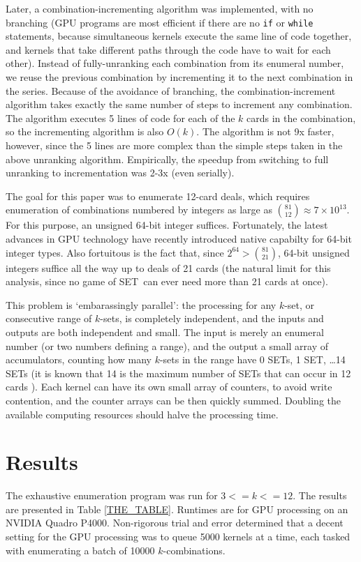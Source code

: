 \documentclass[10pt]{amsart}
\newcommand{\SETb}{SET\texttrademark\ } %
\begin{document}
Later, a combination-incrementing algorithm was implemented, with no branching
(GPU programs are most efficient if there are no {\tt if} or {\tt while}
statements, because simultaneous kernels execute the same line of code together,
and kernels that take different paths through the code have to wait for each
other). Instead of fully-unranking each combination from its enumeral number, we
reuse the previous combination by incrementing it to the next combination in the
series. Because of the avoidance of branching, the combination-increment
algorithm takes exactly the same number of steps to increment any
combination. The algorithm executes 5 lines of code for each of the $k$ cards in
the combination, so the incrementing algorithm is also $O(k)$. The algorithm is
not 9x faster, however, since the 5 lines are more complex than the simple steps
taken in the above unranking algorithm. Empirically, the speedup from switching
to full unranking to incrementation was 2-3x (even serially).

The goal for this paper was to enumerate 12-card deals, which requires
enumeration of combinations numbered by integers as large as $\binom{81}{12}
\approx 7\times 10^{13}$. For this purpose, an unsigned 64-bit integer
suffices. Fortunately, the latest advances in GPU technology have recently
introduced native capabilty for 64-bit integer types. Also fortuitous is the
fact that, since $2^{64} > \binom{81}{21}$, 64-bit unsigned integers suffice all
the way up to deals of 21 cards (the natural limit for this analysis, since no
game of \SETb can ever need more than 21 cards at once).

This problem is `embarassingly parallel': the processing for any $k$-set, or
consecutive range of $k$-sets, is completely independent, and the inputs and
outputs are both independent and small. The input is merely an enumeral number
(or two numbers defining a range), and the output a small array of accumulators,
counting how many $k$-sets in the range have 0 SETs, 1 SET, \ldots 14 SETs (it
is known that 14 is the maximum number of SETs that can occur in 12 cards
\cite{VINCI}). Each kernel can have its own small array of counters, to avoid
write contention, and the counter arrays can be then quickly summed. Doubling
the available computing resources should halve the processing time.

\section{Results}
The exhaustive enumeration program was run for $3<=k<=12$. The results are
presented in Table \ref{THE_TABLE}. Runtimes are for GPU processing on an
NVIDIA Quadro P4000. Non-rigorous trial and error determined that a decent
setting for the GPU processing was to queue 5000 kernels at a time, each tasked
with enumerating a batch of 10000 $k$-combinations.
\end{document}
